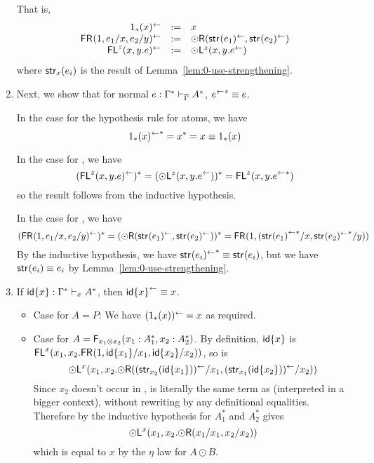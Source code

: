 \begin{enumerate}
\begin{itemize}
\end{itemize}

That is,
\[
\begin{array}{rcl}
1_*(x)^{\leftarrow} & := & x\\
\mathsf{FR}_{}(1,e_1/x,e_2/y)^{\leftarrow} & := & \mathord{\odot}\mathsf{R}(\mathsf{str}_{}(e_1)^{\leftarrow},\mathsf{str}_{}(e_2)^{\leftarrow})\\
\mathsf{FL}^{z}(x,y.e)^{\leftarrow} & := & \mathord{\odot}\mathsf{L}^{z}(x,y.e^{\leftarrow})\\
\end{array}
\]
where $\mathsf{str}_{x}(e_i)$ is the result of Lemma~\ref{lem:0-use-strengthening}.  

\item Next, we show that for normal $e :
  \Gamma^* \vdash_{\overline{\Gamma}} A^*$, ${e^{\leftarrow}}^* \equiv e$.

In the case for the hypothesis rule for atoms, we have
\[
{1_*(x)^{\leftarrow}}^* = x^* = x \equiv 1_*(x)
\]

In the case for \FL, we have 
\[
(\mathsf{FL}^{z}(x,y.e)^{\leftarrow})^* = (\mathord{\odot}\mathsf{L}^{z}(x,y.e^{\leftarrow}))^* =
{\mathsf{FL}^{z}(x,y.{e^{\leftarrow}}^*)}
\]
so the result follows from the inductive hypothesis.  

In the case for \FR, we have
\[
(\mathsf{FR}_{}(1,e_1/x,e_2/y)^{\leftarrow})^* = (\mathord{\odot}\mathsf{R}(\mathsf{str}_{}(e_1)^{\leftarrow},\mathsf{str}_{}(e_2)^{\leftarrow}))^* =
{\mathsf{FR}_{}(1,({{\mathsf{str}_{}(e_1)}^{\leftarrow}}^*/x,{\mathsf{str}_{}(e_2)^{\leftarrow}}^*/y))}
\]
By the inductive hypothesis, we have 
${\mathsf{str}_{}(e_i)^{\leftarrow}}^* \equiv \mathsf{str}_{}(e_i)$, but we have $\mathsf{str}_{}(e_i) \equiv e_i$ by
Lemma~\ref{lem:0-use-strengthening}.  

\item If ${\mathsf{id}\{x\}} : \Gamma^* \vdash_{x} A^*$, then
  ${\mathsf{id}\{x\}}^{\leftarrow} \equiv x$.

\begin{itemize}
\item Case for $A = P$: We have $(1_*(x))^{\leftarrow} = x$ as required.

\item Case for $A = \mathsf{F}_{x_1 \otimes x_2}(x_1:A_1^*,x_2:A_2^*)$.  By definition,
${\mathsf{id}\{x\}}$ is 
$\mathsf{FL}^{x}(x_1,x_2.\mathsf{FR}_{}(1,{\mathsf{id}\{x_1\}}/x_1,{\mathsf{id}\{x_2\}}/x_2))$, 
so 
 is 
\[
\mathord{\odot}\mathsf{L}^{x}(x_1,x_2.\mathord{\odot}\mathsf{R}((\mathsf{str}_{x_2}({\mathsf{id}\{x_1\}}))^{\leftarrow}/x_1,(\mathsf{str}_{x_1}({\mathsf{id}\{x_2\}}))^{\leftarrow}/x_2))
\]
Since $x_2$ doesn't occur in , 
is literally the same term as {} (interpreted in a
bigger context), without rewriting by any definitional equalities.  
Therefore by the inductive hypothesis for $A_1^*$ and $A_2^*$ gives
\[
\mathord{\odot}\mathsf{L}^{x}(x_1,x_2.\mathord{\odot}\mathsf{R}({x_1}/x_1,{x_2}/x_2))
\]
which is equal to $x$ by the $\eta$ law for $A \odot B$.


\end{itemize}
\end{enumerate}
